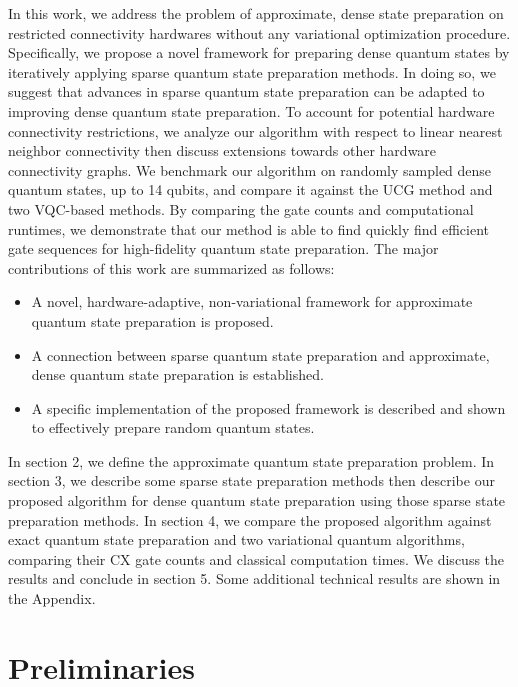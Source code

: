 \documentclass{article}
\begin{document}
In this work, we address the problem of approximate, dense state preparation on
restricted connectivity hardwares without any variational optimization 
procedure. Specifically, we propose a novel 
framework for preparing dense quantum states by iteratively applying sparse 
quantum state preparation methods. In doing so, we suggest that advances in 
sparse quantum state preparation can be adapted to improving dense quantum state
preparation. To account for potential hardware connectivity restrictions, we
analyze our algorithm with respect to linear nearest neighbor connectivity then
discuss extensions towards other hardware connectivity graphs. We benchmark
our algorithm on randomly sampled dense quantum states, up to 14 qubits, and
compare it against the UCG method and two VQC-based methods. By comparing the
gate counts and computational runtimes, we demonstrate that our method is able
to find quickly find efficient gate sequences for high-fidelity quantum state 
preparation. The major contributions of this work are summarized as follows:
\begin{itemize}
  \item A novel, hardware-adaptive, non-variational framework for approximate 
    quantum state preparation is proposed.
  \item A connection between sparse quantum state preparation and approximate,
    dense quantum state preparation is established.
  \item A specific implementation of the proposed framework is described and
    shown to effectively prepare random quantum states.
\end{itemize}

In section 2, we define the approximate quantum state preparation
problem. In section 3, we describe some sparse state preparation methods 
then describe our proposed algorithm for dense quantum state
preparation using those sparse state preparation methods. In section 4, we
compare the proposed algorithm against exact quantum state preparation and two
variational quantum algorithms, comparing their CX gate counts and classical
computation times. We discuss the results and conclude in section 5.
Some additional technical results are shown in the Appendix.

\section{Preliminaries}
\end{document}
